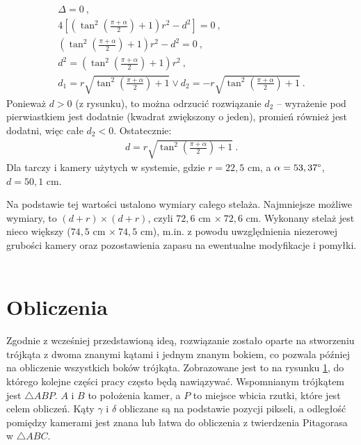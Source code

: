\begin{gather*}
\Delta = 0\ , \\
4[(\tan^2(\frac{\pi + \alpha}{2}) + 1)r^2 - d^2] = 0\ , \\
(\tan^2(\frac{\pi + \alpha}{2}) + 1)r^2 - d^2 = 0\ , \\
d^2 = (\tan^2(\frac{\pi + \alpha}{2}) + 1)r^2\ , \\
d_1 = r\sqrt{\tan^2(\frac{\pi + \alpha}{2}) + 1} \lor d_2 = - r\sqrt{\tan^2(\frac{\pi + \alpha}{2}) + 1}\ .
\end{gather*}
Ponieważ $d > 0$ (z rysunku), to można odrzucić rozwiązanie $d_2$ -- wyrażenie pod pierwiastkiem jest dodatnie (kwadrat zwiększony o jeden), promień również jest dodatni, więc całe $d_2 < 0$. Ostatecznie:
\begin{gather*}
d = r\sqrt{\tan^2(\frac{\pi + \alpha}{2}) + 1}\ .
\end{gather*}
Dla tarczy i kamery użytych w systemie, gdzie $r = 22,5$ cm, a $\alpha = 53,37\degree$, $d = 50,1$ cm.

Na podstawie tej wartości ustalono wymiary całego stelaża. Najmniejsze możliwe wymiary, to $(d + r) \times (d + r)$, czyli $72,6$ cm $\times \ 72,6$ cm. Wykonany stelaż jest nieco większy ($74,5$ cm $\times \ 74,5$ cm), m.in. z powodu uwzględnienia niezerowej grubości kamery oraz pozostawienia zapasu na ewentualne modyfikacje i pomyłki.

\begin{gather*}
\end{gather*}

\section{Obliczenia}
Zgodnie z wcześniej przedstawioną ideą, rozwiązanie zostało oparte na stworzeniu trójkąta z dwoma znanymi kątami i jednym znanym bokiem, co pozwala później na obliczenie wszystkich boków trójkąta. Zobrazowane jest to na rysunku \ref{stelaz_trojkat}, do którego kolejne części pracy często będą nawiązywać. Wspomnianym trójkątem jest $\triangle ABP$. $A$ i $B$ to położenia kamer, a $P$ to miejsce wbicia rzutki, które jest celem obliczeń. Kąty $\gamma$ i $\delta$ obliczane są na podstawie pozycji pikseli, a odległość pomiędzy kamerami jest znana lub łatwa do obliczenia z twierdzenia Pitagorasa w $\triangle ABC$.

\begin{figure}[h!]
\begin{center}

\end{center}
\label{stelaz_trojkat}
\end{figure} 

